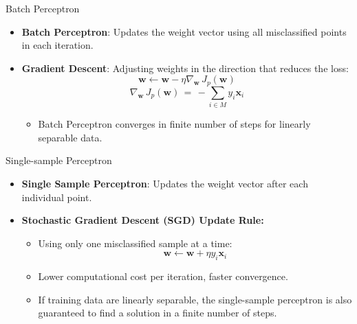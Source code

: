 \documentclass[serif, aspectratio=169]{beamer}
\begin{document}
\begin{frame}{Batch Perceptron}
    \begin{itemize}\itemsep1.5em
        \item \justifying \textbf{Batch Perceptron}:
        Updates the weight vector using all misclassified points in each iteration.
        \item \justifying \textbf{Gradient Descent}:
        Adjusting weights in the direction that reduces the loss:
        \[
        \mathbf{w} \leftarrow \mathbf{w} - \eta \nabla_\mathbf{w} \, J_p(\mathbf{w})
        \]
        \[
        \nabla_\mathbf{w} \, J_p(\mathbf{w}) \, = \, - \sum_{i \in M} y_i \mathbf{x}_i
        \]
        \begin{itemize}
            \item Batch Perceptron converges in finite number of steps for linearly separable data.
        \end{itemize}
    \end{itemize}
\end{frame}

\begin{frame}{Single-sample Perceptron}
    \begin{itemize}\itemsep1.5em
        \item \justifying \textbf{Single Sample Perceptron}: Updates the weight vector after each individual point.
        \item \textbf{Stochastic Gradient Descent (SGD) Update Rule:}
        \smallskip
        \begin{itemize}\itemsep1em
            \item Using only one misclassified sample at a time:
            \[
            \mathbf{w} \leftarrow \mathbf{w} + \eta y_i \mathbf{x}_i
            \]
            \item Lower computational cost per iteration, faster convergence.
            \item \justifying If training data are linearly separable, the single-sample perceptron is also guaranteed to find a solution in a finite number of steps.
        \end{itemize}
    \end{itemize}
\end{frame}
\end{document}
